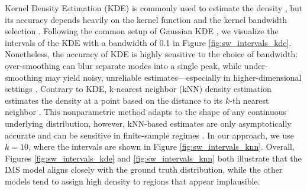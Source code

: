 \documentclass[a4paper,oneside,bibliography=totoc]{scrbook}
\begin{document}
Kernel Density Estimation (KDE) \cite{parzen_estimation_1962} is commonly used to estimate the density \cite{rosenblatt_estimation_1956, chen_multiple_2024, meszaros_rome_2024, olsen_think_2024}, but its accuracy depends heavily on the kernel function and the kernel bandwidth selection \cite{chen_multiple_2024}. 
Following the common setup of Gaussian KDE \cite{scott_multivariate_2015, olsen_think_2024}, we visualize the intervals of the KDE with a bandwidth of 0.1 in Figure \ref{fig:sw_intervals_kde}.
Nonetheless, the accuracy of KDE is highly sensitive to the choice of bandwidth: over-smoothing can blur separate modes into a single peak, while under-smoothing may yield noisy, unreliable estimates—especially in higher-dimensional settings \cite{chen_multiple_2024}.
Contrary to KDE, k-nearest neighbor (kNN) density estimation \cite{loftsgaarden_nonparametric_1965} estimates the density at a point based on the distance to its $k$-th nearest neighbor \cite{loftsgaarden_nonparametric_1965, zhao_analysis_2022}. 
This nonparametric method adapts to the shape of any continuous underlying distribution, however, kNN-based estimates are only asymptotically accurate and can be sensitive in finite-sample regimes \cite{dasgupta_optimal_2014, zhao_convergence_2021, olsen_think_2024}.
In our approach, we use $k=10$, where the intervals are shown in Figure \ref{fig:sw_intervals_knn}. 
Overall, Figures \ref{fig:sw_intervals_kde} and \ref{fig:sw_intervals_knn} both illustrate that the IMS model aligns closely with the ground truth distribution, while the other models tend to assign high density to regions that appear implausible.
\end{document}

